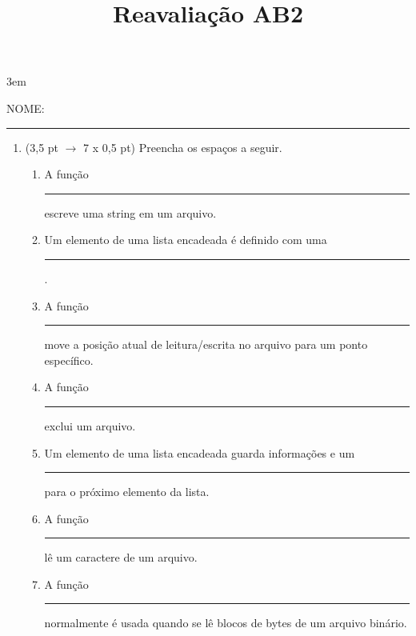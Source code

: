\documentclass[a4paper,10pt]{article}
\title{Reavaliação AB2}
\begin{document}
\maketitle

\emergencystretch 3em



NOME: \rule{.85\textwidth}{0.1mm}

\begin{multicols*}{2}
\setlength{\leftmargini}{0pt}
\begin{enumerate}
  \item (3,5 pt $\rightarrow$ 7 x 0,5 pt) Preencha os espaços a seguir.

  \begin{enumerate}
    \item A função \rule{1cm}{0.2mm} escreve uma string em um arquivo. %
    \item Um elemento de uma lista encadeada é definido com uma \rule{1cm}{0.2mm}. %
    \item A função \rule{1cm}{0.2mm} move a posição atual de leitura/escrita no arquivo para um ponto específico. %
    \item A função \rule{1cm}{0.2mm} exclui um arquivo. %
    \item Um elemento de uma lista encadeada guarda informações e um \rule{1cm}{0.2mm} para o próximo elemento da lista. %
    \item A função \rule{1cm}{0.2mm} lê um caractere de um arquivo. %
    \item A função \rule{1cm}{0.2mm} normalmente é usada quando se lê blocos de bytes de um arquivo binário. %
  \end{enumerate}


\end{enumerate}
\end{multicols*}
\end{document}
